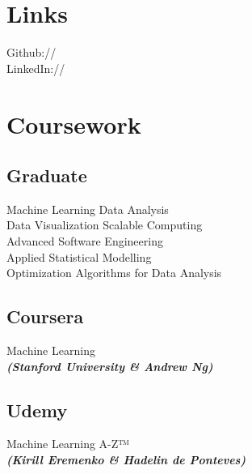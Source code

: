 \documentclass[]{aj-resume-openfont}
\begin{document}
\begin{minipage}[t]{0.33\textwidth}
\section{Links} 
Github:// \href{https://github.com/AjayKumar4}{} \\
LinkedIn://  \href{https://www.linkedin.com/in/nuajaykumar}{} \\
\sectionsep


\section{Coursework}
\subsection{Graduate}
\textbullet{} Machine Learning\textbullet{} Data Analysis\\
\textbullet{} Data Visualization\textbullet{} Scalable Computing\\
\textbullet{} Advanced Software Engineering\\
\textbullet{} Applied Statistical Modelling\\
\textbullet{} Optimization Algorithms for Data Analysis\\
\sectionsep

\subsection{Coursera}
Machine Learning \\
{\footnotesize \textit{\textbf{(Stanford University \& Andrew Ng) }}} \\
\sectionsep

\subsection{Udemy}
Machine Learning A-Z™ \\
{\footnotesize \textit{\textbf{(Kirill Eremenko \& Hadelin de Ponteves) }}} \\
\sectionsep


\end{minipage}
\end{document}
